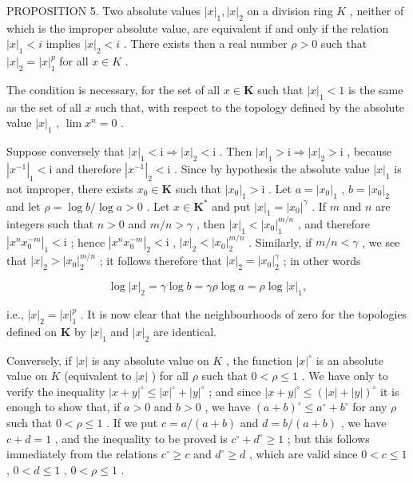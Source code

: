 PROPOSITION 5. Two absolute values \(|x|_1, |x|_2\) on a division ring \(K\) , neither of which is the improper absolute value, are equivalent if and only if the relation \(|x|_1 < i\) implies \(|x|_2 < i\) . There exists then a real number \(\rho > 0\) such that \(|x|_2 = |x|_1^p\) for all \(x \in K\) .

The condition is necessary, for the set of all \(x \in \mathbf{K}\) such that \(|x|_1 < 1\) is the same as the set of all \(x\) such that, with respect to the topology defined by the absolute value \(|x|_1\) , \(\lim x^n = 0\) .

Suppose conversely that \(|x|_1 < \mathrm{i} \Longrightarrow |x|_2 < \mathrm{i}\) . Then \(|x|_1 > \mathrm{i} \Longrightarrow |x|_2 > \mathrm{i}\) , because \(|x^{-1}|_1 < \mathrm{i}\) and therefore \(|x^{-1}|_2 < \mathrm{i}\) . Since by hypothesis the absolute value \(|x|_1\) is not improper, there exists \(x_0 \in \mathbf{K}\) such that \(|x_0|_1 > \mathrm{i}\) . Let \(a = |x_0|_1\) , \(b = |x_0|_2\) and let \(\rho = \log b / \log a > 0\) . Let \(x \in \mathbf{K}^*\) and put \(|x|_1 = |x_0|^{\gamma}\) . If \(m\) and \(n\) are integers such that \(n > 0\) and \(m/n > \gamma\) , then \(|x|_1 < |x_0|_1^{m/n}\) , and therefore \(|x^n x_0^{-m}|_1 < \mathrm{i}\) ; hence \(|x^n x_0^{-m}|_2 < \mathrm{i}\) , \(|x|_2 < |x_0|_2^{m/n}\) . Similarly, if \(m/n < \gamma\) , we see that \(|x|_2 > |x_0|_2^{m/n}\) ; it follows therefore that \(|x|_2 = |x_0|_2^\gamma\) ; in other words

\[
\log | x | _ {2} = \gamma \log b = \gamma \rho \log a = \rho \log | x | _ {1},
\]

i.e., \(|x|_2 = |x|_1^p\) . It is now clear that the neighbourhoods of zero for the topologies defined on \(\mathbf{K}\) by \(|x|_1\) and \(|x|_2\) are identical.

Conversely, if \(|x|\) is any absolute value on \(K\) , the function \(|x|^{\circ}\) is an absolute value on \(K\) (equivalent to \(|x|\) ) for all \(\rho\) such that \(0 < \rho \leqslant 1\) . We have only to verify the inequality \(|x + y|^{\circ} \leqslant |x|^{\circ} + |y|^{\circ}\) ; and since \(|x + y|^{\circ} \leqslant (|x| + |y|)^{\circ}\) it is enough to show that, if \(a > 0\) and \(b > 0\) , we have \((a + b)^{\circ} \leqslant a^{\circ} + b^{\circ}\) for any \(\rho\) such that \(0 < \rho \leqslant 1\) . If we put \(c = a / (a + b)\) and \(d = b / (a + b)\) , we have \(c + d = 1\) , and the inequality to be proved is \(c^{\circ} + d^{\circ} \geqslant 1\) ; but this follows immediately from the relations \(c^{\circ} \geqslant c\) and \(d^{\circ} \geqslant d\) , which are valid since \(0 < c \leqslant 1\) , \(0 < d \leqslant 1\) , \(0 < \rho \leqslant 1\) .

